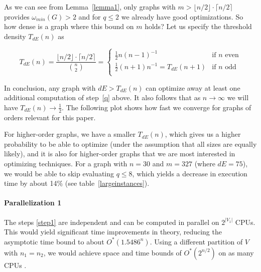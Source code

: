 \documentclass{cslthse-msc}
\newcommand{\density}{dE}
\begin{document}
As we can see from Lemma~\ref{lemma1}, only graphs with $m > \lfloor n / 2 \rfloor \cdot \lceil n / 2 \rceil$ provides $\omega_{min}(G) > 2$ and for $q \leq 2$ we already have good optimizations. So how dense is a graph where this bound on $m$ holds? Let us specify the threshold density $T_{\density{}}(n)$ as

\[
T_{\density{}}(n) = \frac{\lfloor n / 2 \rfloor \cdot \lceil n / 2 \rceil}{\binom{n}{2}} =
\begin{cases}
	  \frac{1}{2}n(n-1)^{-1} & \text{if } n \text{ even}\\
	  \frac{1}{2}(n+1)n^{-1} = T_{\density{}}(n+1) & \text{if } n \text{ odd}\\
\end{cases}
\]

In conclusion, any graph with $\density{} > T_{\density{}}(n)$ can optimize away at least one additional computation of step~\ref{q} above. It also follows that as $n \rightarrow \infty$ we will have $T_{\density{}}(n) \rightarrow \frac{1}{2}$. The following plot shows how fast we converge for graphs of orders relevant for this paper.

\begin{center}
\end{center}
For higher-order graphs, we have a smaller $T_{\density{}}(n)$, which gives us a higher probability to be able to optimize (under the assumption that all sizes are equally likely), and it is also for higher-order graphs that we are most interested in optimizing techniques. For a graph with $n=30$ and $m = 327$ (where $\density{} = 75$), we would be able to skip evaluating $q\leq8$, which yields a decrease in execution time by about 14\% (see table~\ref{largeinstances}).

\paragraph{Parallelization 1}\label{parallelization1} The steps \ref{step1} are independent and can be computed in parallel on $2^{|V_1|}$ CPUs. This would yield significant time improvements in theory, reducing the asymptotic time bound to about $O^*(1.5486^n)$. Using a different partition of $V$ with $n_1 = n_2$, we would achieve space and time bounds of $O^*(2^{n/2})$ on as many CPUs \cite{cov_pack}.
\end{document}
